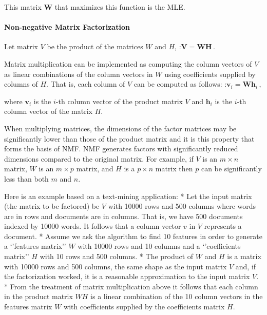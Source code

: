 \documentclass[11pt]{article}
\begin{document}
This matrix \(\mathbf{W}\) that maximizes this function is the MLE.

    \hypertarget{non-negative-matrix-factorization}{%
\paragraph{Non-negative Matrix
Factorization}\label{non-negative-matrix-factorization}}



    Let matrix \(V\) be the product of the matrices \(W\) and \(H\),
:\(\mathbf{V} = \mathbf{W} \mathbf{H} \,.\)

Matrix multiplication can be implemented as computing the column vectors
of \(V\) as linear combinations of the column vectors in \(W\) using
coefficients supplied by columns of \(H\). That is, each column of \(V\)
can be computed as follows:
:\(\mathbf{v}_i = \mathbf{W} \mathbf{h}_{i} \,,\)

where \(\mathbf{v}_i\) is the \(i\)-th column vector of the product
matrix \(V\) and \(\mathbf{h}_{i}\) is the \(i\)-th column vector of the
matrix \(H\).

When multiplying matrices, the dimensions of the factor matrices may be
significantly lower than those of the product matrix and it is this
property that forms the basis of NMF. NMF generates factors with
significantly reduced dimensions compared to the original matrix. For
example, if \(V\) is an \(m × n\) matrix, \(W\) is an \(m × p\) matrix,
and \(H\) is a \(p × n\) matrix then \(p\) can be significantly less
than both \(m\) and \(n\).

Here is an example based on a text-mining application: * Let the input
matrix (the matrix to be factored) be \(V\) with 10000 rows and 500
columns where words are in rows and documents are in columns. That is,
we have 500 documents indexed by 10000 words. It follows that a column
vector \(v\) in \(V\) represents a document. * Assume we ask the
algorithm to find 10 features in order to generate a `'features matrix''
\(W\) with 10000 rows and 10 columns and a `'coefficients matrix'' \(H\)
with 10 rows and 500 columns. * The product of \(W\) and \(H\) is a
matrix with 10000 rows and 500 columns, the same shape as the input
matrix \(V\) and, if the factorization worked, it is a reasonable
approximation to the input matrix \(V\). * From the treatment of matrix
multiplication above it follows that each column in the product matrix
\(WH\) is a linear combination of the 10 column vectors in the features
matrix \(W\) with coefficients supplied by the coefficients matrix
\(H\).
\end{document}
